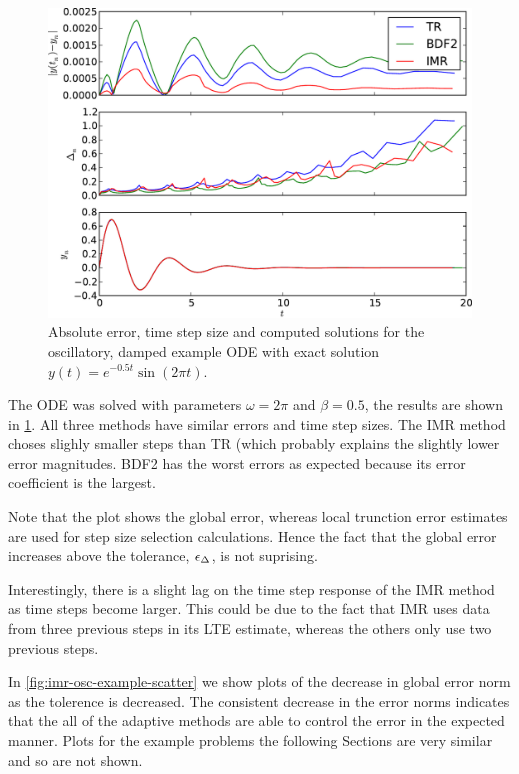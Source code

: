 \begin{figure}
  \centering \includegraphics[width=1\textwidth]{plots/aimr_odes/damped_oscillation-errornormsvs-dtsvs-tracevaluesvstimes}
  \caption{Absolute error, time step size and computed solutions for the oscillatory, damped example ODE with exact solution $y(t) = e^{-0.5t} \sin(2\pi t)$.}
  \label{fig:imr-osc-example}
\end{figure}

The ODE was solved with parameters $\omega = 2 \pi$ and $\beta = 0.5$, the results are shown in \cref{fig:imr-osc-example}.
All three methods have similar errors and time step sizes.
The IMR method choses slighly smaller steps than TR (which probably explains the slightly lower error magnitudes.
BDF2 has the worst errors as expected because its error coefficient is the largest.

Note that the plot shows the global error, whereas local trunction error estimates are used for step size selection calculations.
Hence the fact that the global error increases above the tolerance, $\epsilon_{\Delta_{}}$, is not suprising.

Interestingly, there is a slight lag on the time step response of the IMR method as time steps become larger.
This could be due to the fact that IMR uses data from three previous steps in its LTE estimate, whereas the others only use two previous steps.

In \cref{fig:imr-osc-example-scatter} we show plots of the decrease in global error norm as the tolerence is decreased. 
The consistent decrease in the error norms indicates that the all of the adaptive methods are able to control the error in the expected manner.
Plots for the example problems the following Sections are very similar and so are not shown.

